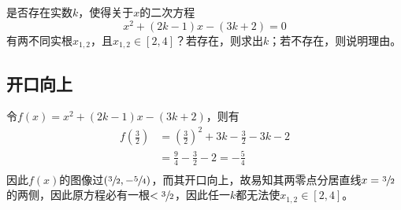 

是否存在实数$k$，使得关于$x$的二次方程
\[ x^2 + (2k - 1)x - (3k + 2) = 0 \]
有两不同实根$x_{1, 2}$，且$x_{1, 2} \in [2, 4]$？若存在，则求出$k$；若不存在，则说明理由。


\subsection{开口向上}

令$f(x) = x^2 + (2k - 1)x - (3k + 2)$，则有
\begin{align*}
  f\left(\frac32\right) &= \left(\frac32\right)^2 + 3k - \frac32 - 3k - 2 \\
  &= \frac94 - \frac32 - 2 = -\frac54 \\
\end{align*}
因此$f(x)$的图像过$(\sfrac32, -\sfrac54)$，而其开口向上，故易知其两零点分居直线$x = \sfrac32$的两侧，因此原方程必有一根$< \sfrac32$，因此任一$k$都无法使$x_{1, 2} \in [2, 4]$。
